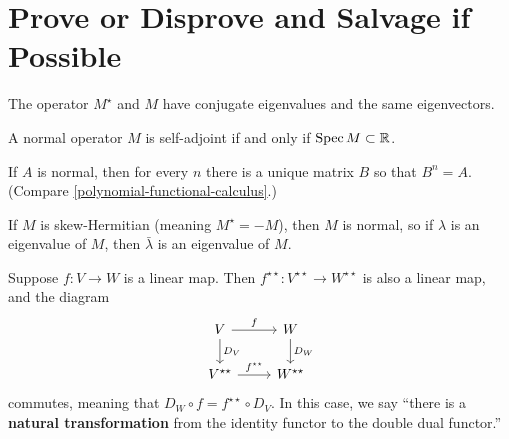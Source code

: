 \documentclass{homework}
\begin{document}

\section{Prove or Disprove and Salvage if Possible}

\begin{problem}%
  The operator $M^\star$ and $M$ have conjugate eigenvalues and the same eigenvectors.
\end{problem}

\begin{problem}
  A normal operator $M$ is self-adjoint if and only if $\operatorname{Spec} M \subset \mathbb{R}$.
\end{problem}

\begin{problem}%
  If $A$ is normal, then for every $n$ there is a unique matrix $B$ so that $B^n = A$.  (Compare \ref{polynomial-functional-calculus}.)
\end{problem}

\begin{problem}%
  If $M$ is skew-Hermitian (meaning $M^\star = -M$), then $M$ is
  normal, so if $\lambda$ is an eigenvalue of $M$, then
  $\bar{\lambda}$ is an eigenvalue of $M$.
\end{problem}

\begin{problem}\label{natural-transformation-to-double-dual}Suppose $f : V \to W$ is a linear map.  Then $f^{\star\star} : V^{\star\star} \to W^{\star\star}$ is also a linear map, and the diagram
  \[\begin{tikzcd}
      V \arrow{r}{f} \arrow{d}{D_V} & W \arrow{d}{D_W} \\
      V^{\star\star} \arrow{r}{f^{\star\star}}  & W^{\star\star}
    \end{tikzcd}\] commutes, meaning that
  $D_W \circ f = f^{\star\star} \circ D_V$.  In this case, we say
  ``there is a \textbf{natural transformation} from the identity
  functor to the double dual functor.''
\end{problem}
\end{document}
